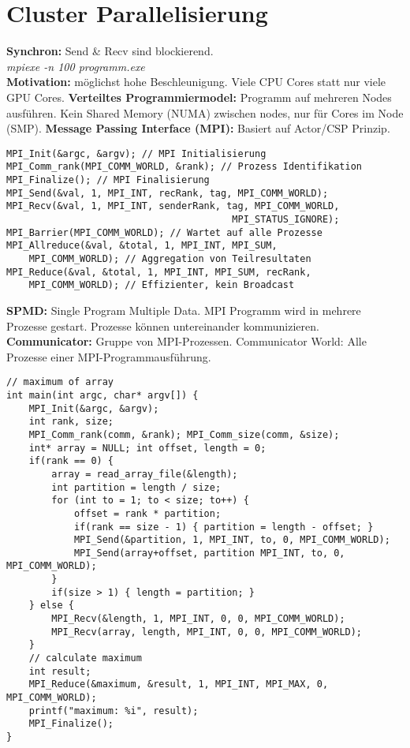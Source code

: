 \section{Cluster Parallelisierung}
\textbf{Synchron:} Send \& Recv sind blockierend.\\ 
\textit{mpiexe -n 100 programm.exe}\\
\textbf{Motivation:} möglichst hohe Beschleunigung. Viele CPU Cores statt nur viele GPU Cores.
\textbf{Verteiltes Programmiermodel:} Programm auf mehreren Nodes ausführen. Kein Shared Memory (NUMA) zwischen nodes, nur für Cores im Node (SMP).
\textbf{Message Passing Interface (MPI):} Basiert auf Actor/CSP Prinzip.
\begin{lstlisting}
MPI_Init(&argc, &argv); // MPI Initialisierung 
MPI_Comm_rank(MPI_COMM_WORLD, &rank); // Prozess Identifikation
MPI_Finalize(); // MPI Finalisierung
MPI_Send(&val, 1, MPI_INT, recRank, tag, MPI_COMM_WORLD);
MPI_Recv(&val, 1, MPI_INT, senderRank, tag, MPI_COMM_WORLD, 
                                        MPI_STATUS_IGNORE);
MPI_Barrier(MPI_COMM_WORLD); // Wartet auf alle Prozesse
MPI_Allreduce(&val, &total, 1, MPI_INT, MPI_SUM, 
    MPI_COMM_WORLD); // Aggregation von Teilresultaten
MPI_Reduce(&val, &total, 1, MPI_INT, MPI_SUM, recRank, 
    MPI_COMM_WORLD); // Effizienter, kein Broadcast
\end{lstlisting}
\textbf{SPMD:} Single Program Multiple Data. MPI Programm wird in mehrere Prozesse gestart.
Prozesse können untereinander kommunizieren.
\textbf{Communicator:} Gruppe von MPI-Prozessen. 
Communicator World: Alle Prozesse einer MPI-Programmausführung.
\begin{lstlisting}
// maximum of array
int main(int argc, char* argv[]) {
    MPI_Init(&argc, &argv);
    int rank, size;
    MPI_Comm_rank(comm, &rank); MPI_Comm_size(comm, &size);
    int* array = NULL; int offset, length = 0;
    if(rank == 0) {
        array = read_array_file(&length);
        int partition = length / size;
        for (int to = 1; to < size; to++) {
            offset = rank * partition;
            if(rank == size - 1) { partition = length - offset; }
            MPI_Send(&partition, 1, MPI_INT, to, 0, MPI_COMM_WORLD);
            MPI_Send(array+offset, partition MPI_INT, to, 0, MPI_COMM_WORLD);
        }
        if(size > 1) { length = partition; }
    } else {
        MPI_Recv(&length, 1, MPI_INT, 0, 0, MPI_COMM_WORLD);
        MPI_Recv(array, length, MPI_INT, 0, 0, MPI_COMM_WORLD);
    }
    // calculate maximum 
    int result;
    MPI_Reduce(&maximum, &result, 1, MPI_INT, MPI_MAX, 0, MPI_COMM_WORLD);
    printf("maximum: %i", result);
    MPI_Finalize();
}
\end{lstlisting}